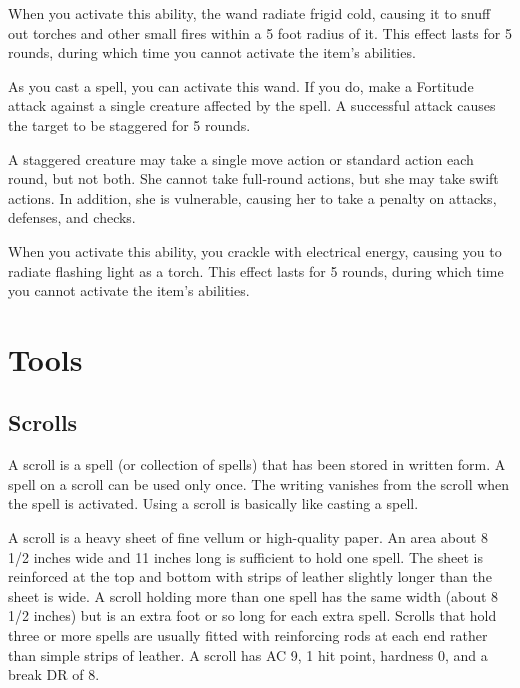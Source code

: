 When you activate this ability, the wand radiate frigid cold, causing it to snuff out torches and other small fires within a 5 foot radius of it.
This effect lasts for 5 rounds, during which time you cannot activate the item's abilities.


 As you cast a spell, you can activate this wand.
If you do, make a Fortitude attack against a single creature affected by the spell.
A successful attack causes the target to be staggered for 5 rounds.

A staggered creature may take a single move action or standard action each round, but not both.
She cannot take full-round actions, but she may take swift actions.
In addition, she is vulnerable, causing her to take a  penalty on attacks, defenses, and checks.

When you activate this ability, you crackle with electrical energy, causing you to radiate flashing light as a torch.
This effect lasts for 5 rounds, during which time you cannot activate the item's abilities.


\section{Tools}

\subsection{Scrolls}
A scroll is a spell (or collection of spells) that has been stored in written form.
A spell on a scroll can be used only once.
The writing vanishes from the scroll when the spell is activated.
Using a scroll is basically like casting a spell.

 A scroll is a heavy sheet of fine vellum or high-quality paper.
An area about 8 1/2 inches wide and 11 inches long is sufficient to hold one spell.
The sheet is reinforced at the top and bottom with strips of leather slightly longer than the sheet is wide.
A scroll holding more than one spell has the same width (about 8 1/2 inches) but is an extra foot or so long for each extra spell.
Scrolls that hold three or more spells are usually fitted with reinforcing rods at each end rather than simple strips of leather.
A scroll has AC 9, 1 hit point, hardness 0, and a break DR of 8.

